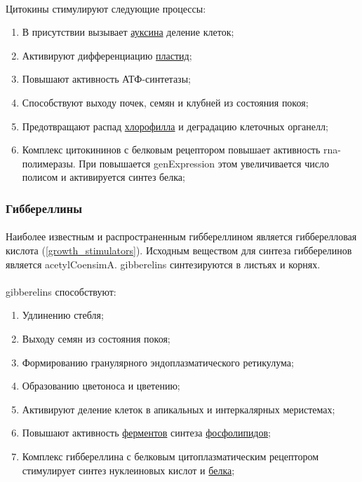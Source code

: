 \paragraph*{}Цитокины стимулируют следующие процессы:

\begin{enumerate}
	\item В присутствии вызывает \hyperlink{auxsin}{ауксина} деление клеток;
	\item Активируют дифференциацию \hyperlink{cell_plastids}{пластид};
	\item Повышают активность АТФ-синтетазы;
	\item Способствуют выходу почек, семян и клубней из состояния покоя;
	\item Предотвращают распад \hyperlink{sect_hlorophilus}{хлорофилла} и деградацию клеточных органелл;
	\item Комплекс цитокининов с белковым рецептором повышает активность \gls{rna}-полимеразы. При повышается \gls{genExpression} этом увеличивается число полисом и активируется синтез белка;
\end{enumerate}

\subsubsection*{Гиббереллины}


\paragraph*{}Наиболее известным и распространенным гиббереллином является гибберелловая кислота (\ris \ref{growth_stimulators}). Исходным веществом для синтеза гибберелинов является \gls{acetylCoensimA}. \gls{gibberelins} синтезируются  в листьях и корнях. 

\paragraph*{}\gls{gibberelins} способствуют:

\begin{enumerate}
	\item Удлинению стебля;
	\item Выходу семян из состояния покоя;
	\item Формированию гранулярного эндоплазматического ретикулума;
	\item Образованию цветоноса и цветению;
	\item Активируют деление клеток в апикальных и интеркалярных меристемах;
	\item Повышают активность \hyperlink{enzimes}{ферментов} синтеза \hyperlink{plipids}{фосфолипидов};
	\item Комплекс гиббереллина с белковым цитоплазматическим рецептором стимулирует синтез нуклеиновых кислот и \hyperlink{proteins}{белка};
\end{enumerate}

